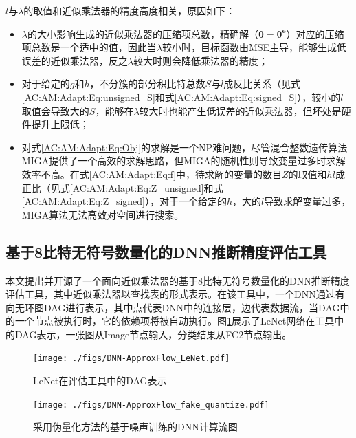 $l$与$\lambda$的取值和近似乘法器的精度高度相关，原因如下：
\begin{itemize}
    \item $\lambda$的大小影响生成的近似乘法器的压缩项总数，精确解（$\boldsymbol{\theta} = \boldsymbol{{\theta}^{e}}$）对应的压缩项总数是一个适中的值，因此当$\lambda$较小时，目标函数由MSE主导，能够生成低误差的近似乘法器，反之$\lambda$较大时则会降低乘法器的精度；
    \item 对于给定的$g$和$h$，不分簇的部分积比特总数$S$与$l$成反比关系（见式\eqref{AC:AM:Adapt:Eq:unsigned_S}和式\eqref{AC:AM:Adapt:Eq:signed_S}），较小的$l$取值会导致大的$S$，能够在$\lambda$较大时也能产生低误差的近似乘法器，但坏处是硬件提升上限低；
    \item 对式\eqref{AC:AM:Adapt:Eq:Obj}的求解是一个NP难问题，尽管混合整数遗传算法MIGA提供了一个高效的求解思路，但MIGA的随机性则导致变量过多时求解效率不高。在式\eqref{AC:AM:Adapt:Eq:f}中，待求解的变量的数目$Z$的取值和$hl$成正比（见式\eqref{AC:AM:Adapt:Eq:Z_unsigned}和式\eqref{AC:AM:Adapt:Eq:Z_signed}），对于一个给定的$h$，大的$l$导致求解变量过多，MIGA算法无法高效对空间进行搜索。
\end{itemize}


\subsection{基于8比特无符号数量化的DNN推断精度评估工具}

本文提出并开源了一个面向近似乘法器的基于8比特无符号数量化的DNN推断精度评估工具，其中近似乘法器以查找表的形式表示。在该工具中，一个DNN通过有向无环图DAG进行表示，其中点代表DNN中的连接层，边代表数据流，当DAG中的一个节点被执行时，它的依赖项将被自动执行。图\ref{DNN:ApproxFlow:Fig:LeNet}展示了LeNet网络\cite{DNN:LeNet_MNIST}在工具中的DAG表示，一张图从Image节点输入，分类结果从FC2节点输出。

\begin{figure}[!ht]
    \centering
    \texttt{[image: ./figs/DNN-ApproxFlow\_LeNet.pdf]}
    \caption{LeNet在评估工具中的DAG表示}
    \label{DNN:ApproxFlow:Fig:LeNet}
\end{figure}

\begin{figure}[!ht]
    \centering
    \texttt{[image: ./figs/DNN-ApproxFlow\_fake\_quantize.pdf]}
    \caption{采用伪量化方法的基于噪声训练的DNN计算流图}
    \label{DNN:ApproxFlow:Fig:fake_quantize_noise}
\end{figure}

